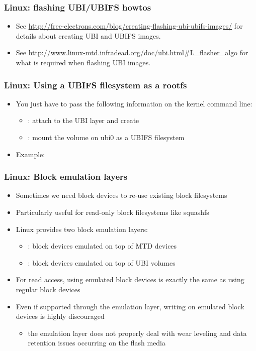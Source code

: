 \begin{frame}
  \frametitle{Linux: flashing UBI/UBIFS howtos}
  \begin{itemize}
  \item See
    \url{http://free-electrons.com/blog/creating-flashing-ubi-ubifs-images/}
    for details about creating UBI and UBIFS images.
  \item See
    \url{http://www.linux-mtd.infradead.org/doc/ubi.html\#L_flasher_algo}
    for what is required when flashing UBI images.
  \end{itemize}
\end{frame}

\begin{frame}
  \frametitle{Linux: Using a UBIFS filesystem as a rootfs}
  \begin{itemize}
  \item You just have to pass the following information on the kernel
    command line:
    \begin{itemize}
    \item {}: attach  to the UBI layer and
      create 
    \item {}: mount the
       volume on ubi0 as a UBIFS filesystem
    \end{itemize}
  \item Example: 
  \end{itemize}
\end{frame}

\begin{frame}
  \frametitle{Linux: Block emulation layers}
  \begin{itemize}
  \item Sometimes we need block devices to re-use existing block
    filesystems
  \item Particularly useful for read-only block filesystems like squashfs
  \item Linux provides two block emulation layers:
    \begin{itemize}
    \item {}: block devices emulated on top of MTD devices
    \item {}: block devices emulated on top of UBI volumes
    \end{itemize}
  \item For read access, using emulated block devices is exactly the same
    as using regular block devices
  \item Even if supported through the  emulation layer,
    writing on emulated block devices is highly discouraged
    \begin{itemize}
    \item the emulation layer does not properly deal with wear
      leveling and data retention issues occurring on the flash media
    \end{itemize}
  \end{itemize}
\end{frame}

